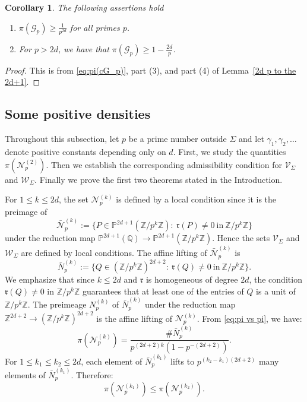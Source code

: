\documentclass[12pt]{amsart}
\newtheorem{corollary}[theorem]{Corollary}
\newcommand{\cN}{\mathcal{N}}
\newcommand{\Z}{\mathbb{Z}}
\newcommand{\cW}{\mathcal{W}}
\newcommand{\Q}{\mathbb{Q}}
\newcommand{\cG}{\mathcal{G}}
\newcommand{\V}{\mathcal{V}}
\numberwithin{equation}{section}
\begin{document}
\begin{corollary}\label{cor:pi Gp lemma}
    The following assertions hold
    \begin{enumerate}
        \item $\displaystyle\pi(\cG_p)\geq \frac{1}{p^{2d}}$ for all primes $p$.
        \item For $p>2d$, we have that $\displaystyle\pi(\cG_p)\geq 1-\frac{2d}{p}$.
    \end{enumerate}
\end{corollary}
\begin{proof}
    This is from \eqref{eq:pi(cG_p)}, part (3), and part (4) of Lemma~\ref{2d p to the 2d+1}.
\end{proof}

\subsection{Some positive densities}
\par Throughout this subsection, let $p$ be a prime number 
outside $\Sigma$ and let $\gamma_1,\gamma_2,\ldots$ denote positive constants depending only on $d$. First, we study the quantities $\pi(\cN_p^{(2)})$. Then we establish the corresponding admissibility condition for $\V_{\Sigma}$ and $\cW_{\Sigma}$. Finally we prove the first two theorems stated in the Introduction.

For $1\leq k\leq 2d$, the set $\cN_p^{(k)}$ is defined by a local condition
since it is the preimage of
$$\bar{\cN}_p^{(k)}:= \{P\in\mathbb{P}^{2d+1}(\Z/p^k\Z):\ \mathfrak{r}(P)\neq 0\ \text{in}\ \Z/p^k\Z\}$$
under the reduction map $\mathbb{P}^{2d+1}(\Q)\rightarrow\mathbb{P}^{2d+1}(\Z/p^k\Z)$. Hence the sets $\V_{\Sigma}$ and $\cW_{\Sigma}$ are defined
by local conditions. 
The affine lifting of $\bar{\cN}_p^{(k)}$ is
$$\bar{N}_p^{(k)}:=\{Q\in(\Z/p^k\Z)^{2d+2}:\ \mathfrak{r}(Q)\neq 0\ \text{in}\ \Z/p^k\Z\}.$$
We emphasize that since $k\leq 2d$ and $\mathfrak{r}$ is homogeneous of 
degree $2d$, the condition $\mathfrak{r}(Q)\neq 0$ in $\Z/p^k\Z$
guarantees that at least one of the entries of $Q$ is a unit of $\Z/p^k\Z$. 
The preimeage $N_p^{(k)}$ of $\bar{N}_p^{(k)}$ under the reduction map
$\Z^{2d+2}\rightarrow (\Z/p^k\Z)^{2d+2}$ is the affine lifting of
$\cN_p^{(k)}$. 
From \eqref{eq:pi vs pi}, we have:
\begin{equation}\label{eq:pi}
    \pi(\cN_p^{(k)})=\frac{\#\bar{N}_p^{(k)}}{p^{(2d+2)k}(1-p^{-(2d+2)})}.
\end{equation}
For $1\leq k_1\leq k_2\leq 2d$, each element of $\bar{N}_p^{(k_1)}$ lifts to
$p^{(k_2-k_1)(2d+2)}$ many elements of $\bar{N}_p^{(k_1)}$. Therefore:
\begin{equation}\label{eq:picNpk1 < picNpk2}
    \pi(\cN_p^{(k_1)})\leq \pi(\cN_p^{(k_2)}). 
\end{equation}
\end{document}
